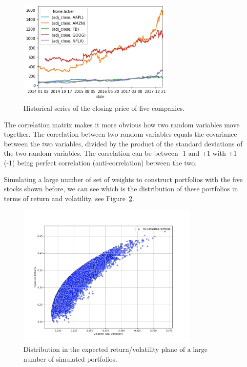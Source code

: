     \begin{figure}
    \centering
    \includegraphics[width=0.7\textwidth]{figures/markowitz_4_1.png}
    \caption{Historical series of the closing price of five companies.}
    \label{fig:stocks}
    \end{figure}
    
    The correlation matrix makes it more obvious how two random variables
move together. The correlation between two random variables equals the
covariance between the two variables, divided by the product of the
standard deviations of the two random variables. The correlation can be
between -1 and +1 with +1 (-1) being perfect correlation
(anti-correlation) between the two.

Simulating a large number of set of weights to construct portfolios with the five stocks shown before, we can see which is the
distribution of these portfolios in terms of return and volatility, see Figure~\ref{fig:mc_portfolio}.

\begin{figure}[tb]
\centering
\includegraphics[width=0.8\textwidth]{figures/Figure_1.png}
\caption{Distribution in the expected return/volatility plane of a large number of simulated portfolios.}
\label{fig:mc_portfolio}
\end{figure}



